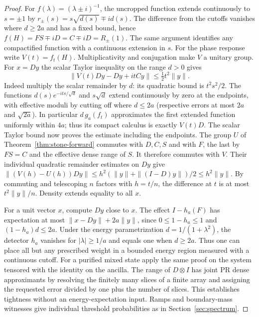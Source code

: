 \begin{proof}
For $f(\lambda)=(\lambda\pm i)^{-1}$, the uncropped function extends continuously to $s=\pm1$ by $r_\pm(s)=s\sqrt{d(s)}\mp i d(s)$. The difference from the cutoffs vanishes where $d\ge2a$ and has a fixed bound, hence $f(H)=FS\mp iD=C\mp iD=R_\pm(1)$. The same argument identifies any compactified function with a continuous extension in $s$. For the phase response write $V(t)=f_t(H)$. Multiplicativity and conjugation make $V$ a unitary group. For $x=Dy$ the scalar Taylor inequality on the range $d>0$ gives
\[
 \|V(t)Dy-Dy+itCy\|\le \tfrac12 t^2\|y\|.
\]
Indeed multiply the scalar remainder by $d$: its quadratic bound is $t^2s^2/2$. The functions $d(s)e^{-its/\sqrt d}$ and $s\sqrt d$ extend continuously by zero at the endpoints, with effective moduli by cutting off where $d\le2a$ (respective errors at most $2a$ and $\sqrt{2a}$). In particular $d\,g_a(f_t)$ approximates the first extended function uniformly within $4a$; thus its compact calculus is exactly $V(t)D$. The scalar Taylor bound now proves the estimate including the endpoints. The group $U$ of Theorem~\ref{thm:stone-forward} commutes with $D,C,S$ and with $F$, the last by $FS=C$ and the effective dense range of $S$. It therefore commutes with $V$. Their individual quadratic remainder estimates on $Dy$ give $\|(V(h)-U(h))Dy\|\le h^2(\|y\|+\|(I-D)y\|)/2\le h^2\|y\|$. By commuting and telescoping $n$ factors with $h=t/n$, the difference at $t$ is at most $t^2\|y\|/n$. Density extends equality to all $x$.

For a unit vector $x$, compute $Dy$ close to $x$. The effect $I-h_a(F)$ has expectation at most $\|x-Dy\|+2a\|y\|$, since $0\le1-h_a\le1$ and $(1-h_a)d\le2a$. Under the energy parametrization $d=1/(1+\lambda^2)$, the detector $h_a$ vanishes for $|\lambda|\ge1/a$ and equals one when $d\ge2a$. Thus one can place all but any prescribed weight in a bounded energy region measured with a continuous cutoff. For a purified mixed state apply the same proof on the system tensored with the identity on the ancilla. The range of $D\otimes I$ has joint PR dense approximants by resolving the finitely many slices of a finite array and assigning the requested error divided by one plus the number of slices. This establishes tightness without an energy-expectation input. Ramps and boundary-mass witnesses give individual threshold probabilities as in Section~\ref{sec:spectrum}.
\end{proof}

